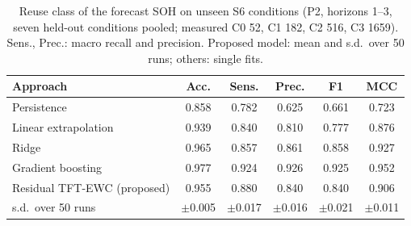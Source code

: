 \begin{table}[t]
  \centering
  \caption{Reuse class of the forecast SOH on unseen S6 conditions (P2, horizons 1--3, seven held-out
    conditions pooled; measured C0 52, C1 182, C2 516, C3 1659). Sens., Prec.: macro recall and precision. Proposed model: mean
    and s.d.\ over 50 runs; others: single fits.}
  \label{tab:d26_classes}
  \setlength{\tabcolsep}{2.2pt}
  \scriptsize
  \begin{tabular}{lccccc}
    \toprule
    Approach & Acc. & Sens. & Prec. & F1 & MCC \\
    \midrule
    Persistence & 0.858 & 0.782 & 0.625 & 0.661 & 0.723 \\
    Linear extrapolation & 0.939 & 0.840 & 0.810 & 0.777 & 0.876 \\
    Ridge & 0.965 & 0.857 & 0.861 & 0.858 & 0.927 \\
    Gradient boosting & 0.977 & 0.924 & 0.926 & 0.925 & 0.952 \\
    Residual TFT-EWC (proposed) & 0.955 & 0.880 & 0.840 & 0.840 & 0.906 \\
    \quad s.d.\ over 50 runs & $\pm$0.005 & $\pm$0.017 & $\pm$0.016 & $\pm$0.021 & $\pm$0.011 \\
    \bottomrule
  \end{tabular}
\end{table}

